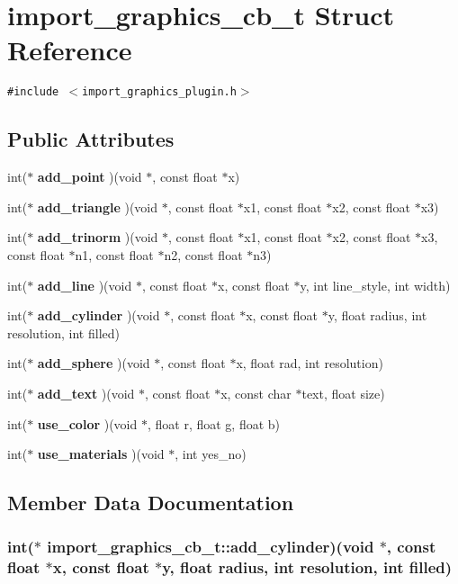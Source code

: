 \section{import\_\-graphics\_\-cb\_\-t  Struct Reference}
\label{structimport__graphics__cb__t}
{\tt \#include $<$import\_\-graphics\_\-plugin.h$>$}

\subsection*{Public Attributes}
\begin{CompactItemize}
\item 
int($\ast$ {\bf add\_\-point} )(void $\ast$, const float $\ast$x)
\item 
int($\ast$ {\bf add\_\-triangle} )(void $\ast$, const float $\ast$x1, const float $\ast$x2, const float $\ast$x3)
\item 
int($\ast$ {\bf add\_\-trinorm} )(void $\ast$, const float $\ast$x1, const float $\ast$x2, const float $\ast$x3, const float $\ast$n1, const float $\ast$n2, const float $\ast$n3)
\item 
int($\ast$ {\bf add\_\-line} )(void $\ast$, const float $\ast$x, const float $\ast$y, int line\_\-style, int width)
\item 
int($\ast$ {\bf add\_\-cylinder} )(void $\ast$, const float $\ast$x, const float $\ast$y, float radius, int resolution, int filled)
\item 
int($\ast$ {\bf add\_\-sphere} )(void $\ast$, const float $\ast$x, float rad, int resolution)
\item 
int($\ast$ {\bf add\_\-text} )(void $\ast$, const float $\ast$x, const char $\ast$text, float size)
\item 
int($\ast$ {\bf use\_\-color} )(void $\ast$, float r, float g, float b)
\item 
int($\ast$ {\bf use\_\-materials} )(void $\ast$, int yes\_\-no)
\end{CompactItemize}


\subsection{Member Data Documentation}
\subsubsection{\setlength{\rightskip}{0pt plus 5cm}int($\ast$  import\_\-graphics\_\-cb\_\-t::add\_\-cylinder)(void $\ast$, const float $\ast$x, const float $\ast$y, float radius, int resolution, int filled)}\label{structimport__graphics__cb__t_m4}


